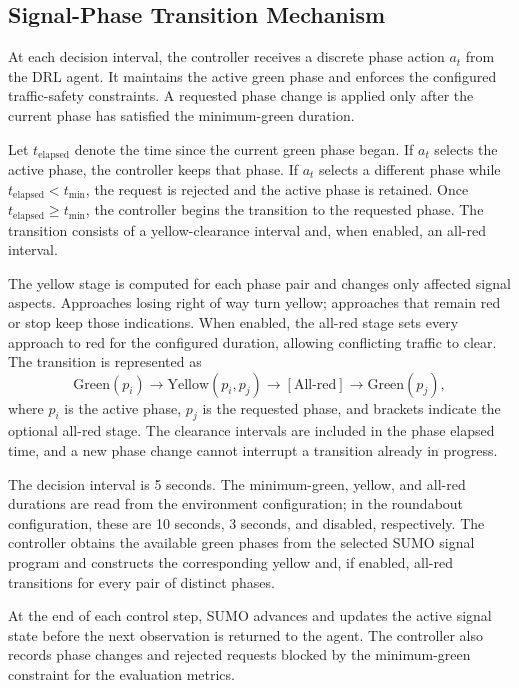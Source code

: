 \subsection{Signal-Phase Transition Mechanism}
At each decision interval, the controller receives a discrete phase action $a_t$ from the DRL agent. It maintains the active green phase and enforces the configured traffic-safety constraints. A requested phase change is applied only after the current phase has satisfied the minimum-green duration.

Let $t_{\mathrm{elapsed}}$ denote the time since the current green phase began. If $a_t$ selects the active phase, the controller keeps that phase. If $a_t$ selects a different phase while $t_{\mathrm{elapsed}} < t_{\mathrm{min}}$, the request is rejected and the active phase is retained. Once $t_{\mathrm{elapsed}} \geq t_{\mathrm{min}}$, the controller begins the transition to the requested phase. The transition consists of a yellow-clearance interval and, when enabled, an all-red interval.

The yellow stage is computed for each phase pair and changes only affected signal aspects. Approaches losing right of way turn yellow; approaches that remain red or stop keep those indications. When enabled, the all-red stage sets every approach to red for the configured duration, allowing conflicting traffic to clear. The transition is represented as
\begin{equation*}
\text{Green}(p_i) \rightarrow \text{Yellow}(p_i,p_j)
\rightarrow [\text{All-red}] \rightarrow \text{Green}(p_j),
\end{equation*}
where $p_i$ is the active phase, $p_j$ is the requested phase, and brackets indicate the optional all-red stage. The clearance intervals are included in the phase elapsed time, and a new phase change cannot interrupt a transition already in progress.

The decision interval is 5 seconds. The minimum-green, yellow, and all-red durations are read from the environment configuration; in the roundabout configuration, these are 10 seconds, 3 seconds, and disabled, respectively. The controller obtains the available green phases from the selected SUMO signal program and constructs the corresponding yellow and, if enabled, all-red transitions for every pair of distinct phases.

At the end of each control step, SUMO advances and updates the active signal state before the next observation is returned to the agent. The controller also records phase changes and rejected requests blocked by the minimum-green constraint for the evaluation metrics.

